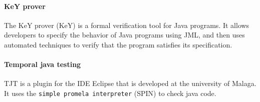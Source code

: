 \paragraph{KeY prover}
The KeY prover (KeY) is a formal verification tool for Java programs. It allows developers to specify the behavior of Java programs using JML, and then uses automated techniques to verify that the program satisfies its specification.
\paragraph[TJT]{Temporal java testing}
TJT is a plugin for the IDE Eclipse that is developed at the university of Malaga. It uses the \verb|simple promela interpreter| (SPIN) to check java code.